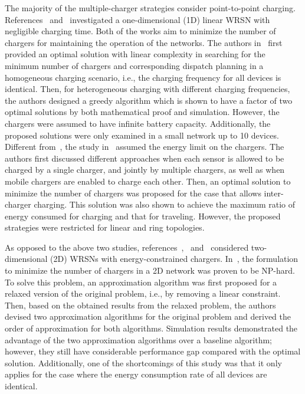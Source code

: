 \documentclass[twocolumn,10pt]{IEEEtran}
\begin{document}
The majority of the multiple-charger strategies consider point-to-point charging. References~\cite{R.2014Beigel} and~\cite{J.2014Wu} investigated a one-dimensional (1D) linear WRSN with negligible charging time. Both of the works aim to minimize the number of chargers for maintaining the operation of the networks. The authors in~\cite{R.2014Beigel} first provided an optimal solution with linear complexity in searching for the minimum number of chargers and corresponding dispatch planning in a homogeneous charging scenario, i.e., the charging frequency for all devices is identical. Then, for heterogeneous charging with different charging frequencies, the authors designed a greedy algorithm which is shown to have a factor of two optimal solutions by both mathematical proof and simulation. However, the chargers were assumed to have infinite battery capacity. Additionally, the proposed solutions were only examined in a small network up to 10 devices. Different from~\cite{R.2014Beigel}, the study in~\cite{J.2014Wu} assumed the energy limit on the chargers. The authors first discussed different approaches when each sensor is allowed to be charged by a single charger, and jointly by multiple chargers, as well as when mobile chargers are enabled to charge each other. Then, an optimal solution to minimize the number of chargers was proposed for the case that allows inter-charger charging. This solution was also shown to achieve the maximum ratio of energy consumed for charging and that for traveling. However, the proposed strategies were restricted for linear and ring topologies.


As opposed to the above two studies, references~\cite{H.Dai2014},~\cite{W.2014Xu} and~\cite{W.2014Liang} considered two-dimensional (2D) WRSNs with energy-constrained chargers. In~\cite{H.Dai2014}, the formulation to minimize the number of chargers in a 2D network was proven to be NP-hard. To solve this problem, an approximation algorithm was first proposed for a relaxed version of the original problem, i.e., by removing a linear constraint. Then, based on the obtained results from the relaxed problem, the authors devised two approximation algorithms for the original problem and derived the order of approximation for both algorithms. Simulation results demonstrated the advantage of the two approximation algorithms over a baseline algorithm; however, they still have considerable performance gap compared with the optimal solution. Additionally, one of the shortcomings of this study was that it only applies for the case where the energy consumption rate of all devices are identical.   
\end{document}
